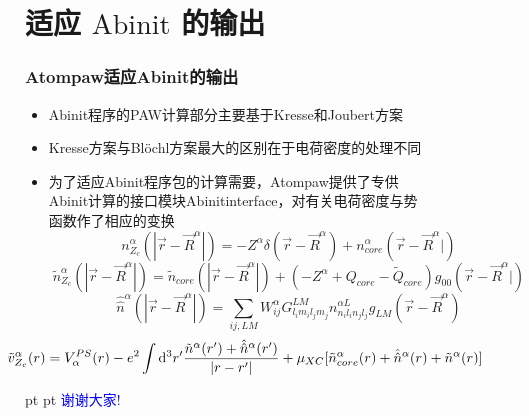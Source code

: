 \documentclass[cjk,slidestop,compress,mathserif,blue]{beamer}
\begin{document}
\section{适应 $\mathrm{Abinit}$ 的输出}
\frame
{
	\frametitle{\textrm{Atompaw}适应\textrm{Abinit}的输出}
	\begin{itemize}
		\item \textrm{Abinit}程序的\textrm{PAW}计算部分主要基于\textrm{Kresse}和\textrm{Joubert}方案
		\item \textrm{Kresse}方案与\textrm{Bl\"ochl}方案最大的区别在于电荷密度的处理不同
		\item 为了适应\textrm{Abinit}程序包的计算需要，\textrm{Atompaw}提供了专供\\\textrm{Abinit}计算的接口模块\textrm{Abinitinterface}，对有关电荷密度与势\\函数作了相应的变换
			$$n_{Z_c}^{\alpha}(|\vec r-\vec R^{\alpha}|)=-Z^{\alpha}\delta(\vec r-\vec R^{\alpha})+n_{core}^{\alpha}(\vec r-\vec R^{\alpha}|)$$
			$$\tilde n_{Z_c}^{\alpha}(|\vec r-\vec R^{\alpha}|)=\tilde n_{core}(|\vec r-\vec R^{\alpha}|)+(-Z^{\alpha}+Q_{core}-\tilde Q_{core})g_{00}(\vec r-\vec R^{\alpha}|)$$
			$${\hat{\hat n}}^{\alpha}(|\vec r-\vec R^{\alpha}|)=\sum_{ij,LM}W_{ij}^{\alpha}G_{l_im_il_jm_j}^{LM}n_{n_il_in_jl_j}^{\alpha L}g_{LM}(\vec r-\vec R^{\alpha})$$
			$$\hspace*{-62pt}\tilde v_{Z_c}^{\alpha}(r)=V_{\alpha}^{PS}(r)-e^2\int\mathrm{d}^3r^{\prime}\dfrac{\tilde n^{\alpha}(r^{\prime})+\hat{\hat{n}}^{\alpha}(r^{\prime})}{|r-r^{\prime}|}+\mu_{XC}[\tilde n_{core}^{\alpha}(r)+\hat{\hat{n}}^{\alpha}(r)+\tilde n^{\alpha}(r)]$$ 
	\end{itemize}
}


\logo{}
\frame
{
 pt
 pt
\hskip 60pt \textcolor{blue}{\Huge 谢谢大家\:!}
}


\clearpage
\end{document}

